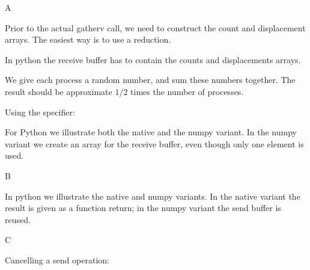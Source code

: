 
 {A}


Prior to the actual gatherv call, we need to construct the count and
displacement arrays. The easiest way is to use a reduction.


In python the receive buffer has to contain the counts and
displacements arrays.



We give each process a random number, and sum these numbers together.
The result should be approximate $1/2$ times the number of processes.


Using the  specifier:


For Python we illustrate both the native and the numpy variant. In the
numpy variant we create an array for the receive buffer, even though
only one element is used.


 {B}


In python we illustrate the native and numpy variants. In the native
variant the result is given as a function return; in the numpy variant
the send buffer is reused.
%

 {C}


Cancelling a send operation:





